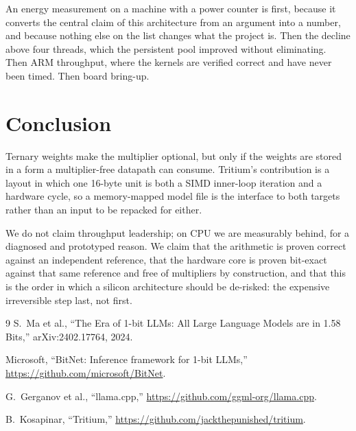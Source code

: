 \documentclass[10pt,twocolumn]{article}
\begin{document}
An energy measurement on a machine with a power counter is first, because it
converts the central claim of this architecture from an argument into a number,
and because nothing else on the list changes what the project is. Then the
decline above four threads, which the persistent pool improved without
eliminating. Then ARM throughput, where the kernels are verified correct and
have never been timed. Then board bring-up.

\section{Conclusion}

Ternary weights make the multiplier optional, but only if the weights are stored
in a form a multiplier-free datapath can consume. Tritium's contribution is a
layout in which one 16-byte unit is both a SIMD inner-loop iteration and a
hardware cycle, so a memory-mapped model file is the interface to both targets
rather than an input to be repacked for either.

We do not claim throughput leadership; on CPU we are measurably behind, for a
diagnosed and prototyped reason. We claim that the arithmetic is proven correct
against an independent reference, that the hardware core is proven bit-exact
against that same reference and free of multipliers by construction, and that
this is the order in which a silicon architecture should be de-risked: the
expensive irreversible step last, not first.

\begin{thebibliography}{9}
\small
{}
S.~Ma et al.,
``The Era of 1-bit LLMs: All Large Language Models are in 1.58 Bits,''
arXiv:2402.17764, 2024.

Microsoft,
``BitNet: Inference framework for 1-bit LLMs,''
\url{https://github.com/microsoft/BitNet}.

G.~Gerganov et al.,
``llama.cpp,''
\url{https://github.com/ggml-org/llama.cpp}.

B.~Kosapinar,
``Tritium,''
\url{https://github.com/jackthepunished/tritium}.
\end{thebibliography}
\end{document}
